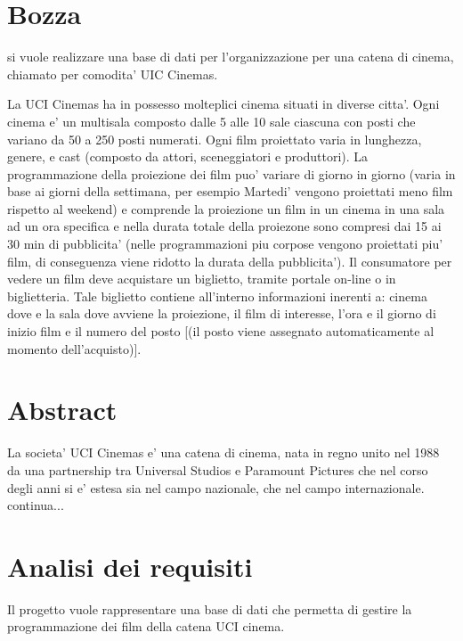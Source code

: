 \documentclass[10pt]{article}
\begin{document}
	\section{Bozza}
	si vuole realizzare una base di dati per l'organizzazione per una catena di cinema, chiamato per comodita' UIC Cinemas.
	
	La UCI Cinemas ha in possesso molteplici cinema situati in diverse citta'. Ogni cinema e' un multisala composto dalle 5 alle 10 sale ciascuna con posti che variano da 50 a 250 posti numerati. Ogni film proiettato varia  in lunghezza, genere, e cast (composto  da attori, sceneggiatori e produttori).
	La programmazione della proiezione dei film puo' variare di giorno in giorno (varia in base ai giorni della settimana, per esempio Martedi' vengono proiettati meno film rispetto al weekend) e comprende la proiezione un film in un cinema in una sala ad un ora specifica e nella durata totale della proiezone sono compresi dai 15 ai 30 min di pubblicita' (nelle programmazioni piu corpose vengono proiettati piu' film, di conseguenza viene ridotto la durata della pubblicita').
	Il consumatore per vedere un film deve acquistare un biglietto, tramite portale on-line o in biglietteria. Tale biglietto contiene all'interno informazioni inerenti a: cinema dove e la sala dove avviene la proiezione, il film di interesse, l'ora e il giorno di inizio film e il numero del posto [(il posto viene assegnato automaticamente al momento dell'acquisto)].
	
	
	\section{Abstract}
	
	La societa' UCI Cinemas e' una catena di cinema, nata in regno unito nel 1988 da una partnership tra Universal Studios e Paramount Pictures che nel corso degli anni si e' estesa sia nel campo nazionale, che nel campo internazionale. 
	continua...
	
	\section{Analisi dei requisiti}
	
	Il progetto vuole rappresentare una base di dati che permetta di gestire la programmazione dei film della catena UCI cinema.
			
\end{document}
